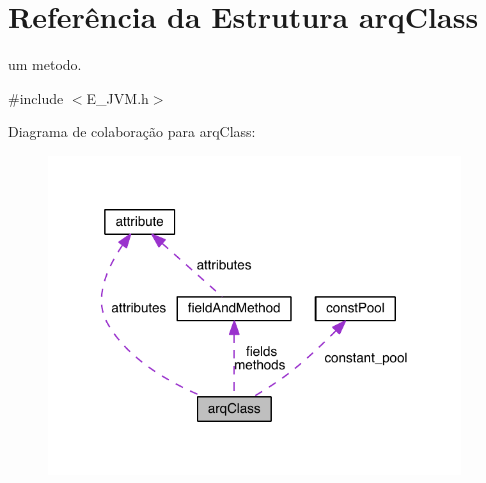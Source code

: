\hypertarget{structarq_class}{}\section{Referência da Estrutura arq\+Class}
\label{structarq_class}


um metodo.  




{\ttfamily \#include $<$E\+\_\+\+J\+V\+M.\+h$>$}



Diagrama de colaboração para arq\+Class\+:\nopagebreak
\begin{figure}[H]
\begin{center}
\leavevmode
\includegraphics[width=310pt]{structarq_class__coll__graph}
\end{center}
\end{figure}
